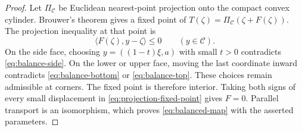 \begin{proof}
Let $\Pi_{\mathcal C}$ be Euclidean nearest-point projection onto the
compact convex cylinder. Brouwer's theorem gives a fixed point of
$T(\zeta)=\Pi_{\mathcal C}(\zeta+F(\zeta))$. The projection inequality
at that point is
\begin{equation}\label{eq:projection-fixed-point}
 \langle F(\zeta),y-\zeta\rangle\le0
                         \qquad(y\in\mathcal C).
\end{equation}
On the side face, choosing $y=((1-t)\xi,a)$ with small $t>0$ contradicts
\eqref{eq:balance-side}. On the lower or upper face, moving the last
coordinate inward contradicts \eqref{eq:balance-bottom} or
\eqref{eq:balance-top}. These choices remain admissible at corners.
The fixed point is therefore interior. Taking both signs of every
small displacement in \eqref{eq:projection-fixed-point} gives $F=0$.
Parallel transport is an isomorphism, which proves
\eqref{eq:balanced-map} with the asserted parameters.
\end{proof}
